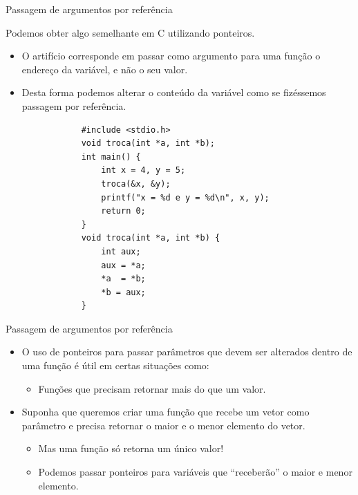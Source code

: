 \documentclass[handout]{beamer}
\begin{document}
\begin{frame}[fragile]{Passagem de argumentos por referência}

    \small
    Podemos obter algo semelhante em C utilizando ponteiros.
    \begin{itemize}[<+->]
        \item O artifício corresponde em passar como argumento para uma função
        o \alert{endereço} da variável, e não o seu valor.
        \item Desta forma podemos alterar o conteúdo da variável como se
        fizéssemos passagem por referência.
        \vspace{-1em}
        \begin{verbatim}
            #include <stdio.h>
            void troca(int *a, int *b);
            int main() {
                int x = 4, y = 5;
                troca(&x, &y);
                printf("x = %d e y = %d\n", x, y);
                return 0;
            }
            void troca(int *a, int *b) {
                int aux;
                aux = *a;
                *a  = *b;
                *b = aux;
            }
        \end{verbatim}
    \end{itemize}

\end{frame}


\begin{frame}[fragile]{Passagem de argumentos por referência}

    \begin{itemize}[<+->]
        \item O uso de ponteiros para passar parâmetros que devem ser alterados dentro de uma
        função é útil em certas situações como:
        \begin{itemize}
            \item Funções que precisam retornar mais do que um valor.
        \end{itemize}
        \item Suponha que queremos criar uma função que recebe um vetor como parâmetro e precisa retornar
        o maior e o menor elemento do vetor.
        \begin{itemize}
            \item Mas uma função só retorna um único valor!
            \item Podemos passar ponteiros para variáveis que ``receberão'' o maior e menor elemento.
        \end{itemize}

    \end{itemize}

\end{frame}
\end{document}
